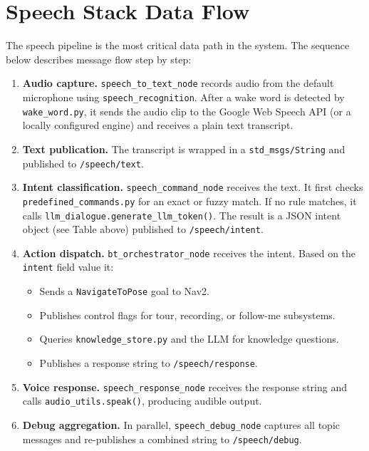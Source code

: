 \documentclass[12pt,a4paper]{report}
\newcommand{\topic}[1]{\texttt{\color{purple!80!black}#1}}
\newcommand{\file}[1]{\texttt{\color{black!70}#1}}
\newcommand{\node}[1]{\texttt{\color{Maroon}#1}}
\begin{document}
\section{Speech Stack Data Flow}
\label{sec:speech_flow}

The speech pipeline is the most critical data path in the system.  The
sequence below describes message flow step by step:

\begin{enumerate}[leftmargin=2em]
  \item \textbf{Audio capture.}
    \node{speech\_to\_text\_node} records audio from the default
    microphone using \texttt{speech\_recognition}.  After a wake word is
    detected by \file{wake\_word.py}, it sends the audio clip to the
    Google Web Speech API (or a locally configured engine) and receives a
    plain text transcript.

  \item \textbf{Text publication.}
    The transcript is wrapped in a \texttt{std\_msgs/String} and published
    to \topic{/speech/text}.

  \item \textbf{Intent classification.}
    \node{speech\_command\_node} receives the text.  It first checks
    \file{predefined\_commands.py} for an exact or fuzzy match.  If no
    rule matches, it calls \texttt{llm\_dialogue.generate\_llm\_token()}.
    The result is a JSON intent object (see Table above) published to
    \topic{/speech/intent}.

  \item \textbf{Action dispatch.}
    \node{bt\_orchestrator\_node} receives the intent.  Based on the
    \texttt{intent} field value it:
    \begin{itemize}
      \item Sends a \texttt{NavigateToPose} goal to Nav2.
      \item Publishes control flags for tour, recording, or follow-me subsystems.
      \item Queries \file{knowledge\_store.py} and the LLM for knowledge
            questions.
      \item Publishes a response string to \topic{/speech/response}.
    \end{itemize}

  \item \textbf{Voice response.}
    \node{speech\_response\_node} receives the response string and calls
    \texttt{audio\_utils.speak()}, producing audible output.

  \item \textbf{Debug aggregation.}
    In parallel, \node{speech\_debug\_node} captures all topic messages
    and re-publishes a combined string to \topic{/speech/debug}.
\end{enumerate}
\end{document}
